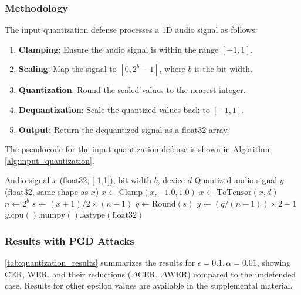 \documentclass[a4paper,12pt]{article}
\begin{document}
\subsubsection{Methodology}
The input quantization defense processes a 1D audio signal as follows:
\begin{enumerate}
    \item \textbf{Clamping}: Ensure the audio signal is within the range $[-1, 1]$.
    \item \textbf{Scaling}: Map the signal to $[0, 2^b - 1]$, where $b$ is the bit-width.
    \item \textbf{Quantization}: Round the scaled values to the nearest integer.
    \item \textbf{Dequantization}: Scale the quantized values back to $[-1, 1]$.
    \item \textbf{Output}: Return the dequantized signal as a float32 array.
\end{enumerate}

The pseudocode for the input quantization defense is shown in Algorithm \ref{alg:input_quantization}.

\begin{algorithm}[H]
\caption{Input Quantization Defense}
\label{alg:input_quantization}
\begin{algorithmic}[1]
\Require Audio signal $x$ (float32, [-1,1]), bit-width $b$, device $d$
\Ensure Quantized audio signal $y$ (float32, same shape as $x$)
\State $x \gets \text{Clamp}(x, -1.0, 1.0)$ 
\State $x \gets \text{ToTensor}(x, d)$ 
\State $n \gets 2^b$ 
\State $s \gets (x + 1) / 2 \times (n - 1)$ 
\State $q \gets \text{Round}(s)$ 
\State $y \gets (q / (n - 1)) \times 2 - 1$ 
\State \Return $y.\text{cpu}().\text{numpy}().\text{astype}(\text{float32})$
\end{algorithmic}
\end{algorithm}


\subsubsection{Results with PGD Attacks}
\ref{tab:quantization_results} summarizes the results for $\epsilon=0.1, \alpha=0.01$, showing CER, WER, and their reductions ($\Delta$CER, $\Delta$WER) compared to the undefended case. Results for other epsilon values are available in the supplemental material.
\end{document}
